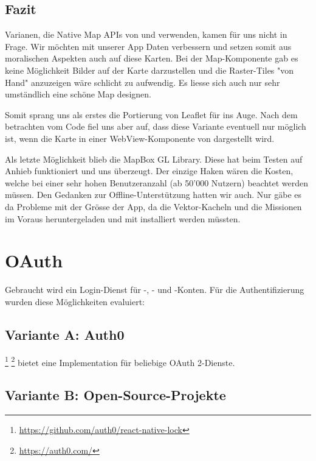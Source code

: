 \subsection{Fazit}

Varianen, die Native Map APIs von  und  verwenden, kamen für uns nicht in Frage.
Wir möchten mit unserer App  Daten verbessern und setzen somit aus moralischen Aspekten auch auf diese Karten.
Bei der  Map-Komponente gab es keine Möglichkeit Bilder auf der Karte darzustellen und die Raster-Tiles "von Hand" anzuzeigen wäre schlicht zu aufwendig. 
Es liesse sich auch nur sehr umständlich eine schöne Map designen.

Somit sprang uns als erstes die Portierung von Leaflet für  ins Auge. 
Nach dem betrachten vom Code fiel uns aber auf, dass diese Variante eventuell nur möglich ist, wenn die Karte in einer WebView-Komponente von  dargestellt wird.

Als letzte Möglichkeit blieb die MapBox GL Library.
Diese hat beim Testen auf Anhieb funktioniert und uns überzeugt.
Der einzige Haken wären die Kosten, welche bei einer sehr hohen Benutzeranzahl (ab 50'000 Nutzern) beachtet werden müssen.
Den Gedanken zur Offline-Unterstützung hatten wir auch.
Nur gäbe es da Probleme mit der Grösse der App, da die Vektor-Kacheln und die Missionen im Voraus heruntergeladen und mit installiert werden müssten.

\section{OAuth}
Gebraucht wird ein Login-Dienst für -, - und -Konten. 
Für die Authentifizierung wurden diese Möglichkeiten evaluiert:

\subsection{Variante A: Auth0}

\footnote{\url{https://github.com/auth0/react-native-lock}} \footnote{\url{https://auth0.com/}} bietet eine Implementation für beliebige OAuth 2-Dienste. 

\subsection{Variante B: Open-Source-Projekte}

